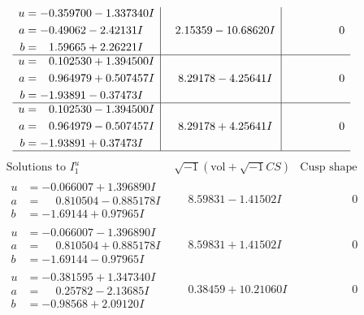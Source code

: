 \documentclass[1p]{elsarticle_modified}
\theoremstyle{definition}
\newcommand{\I}{\sqrt{-1}}
\begin{document}
$$\begin{array}{c|c|c}
\begin{aligned}
u &= -0.359700 - 1.337340 I \\
a &= -0.49062 - 2.42131 I \\
b &= \phantom{-}1.59665 + 2.26221 I\end{aligned}
 & \phantom{-}2.15359 - 10.68620 I & \phantom{-0.000000 } 0 \\ \hline\begin{aligned}
u &= \phantom{-}0.102530 + 1.394500 I \\
a &= \phantom{-}0.964979 + 0.507457 I \\
b &= -1.93891 - 0.37473 I\end{aligned}
 & \phantom{-}8.29178 - 4.25641 I & \phantom{-0.000000 } 0 \\ \hline\begin{aligned}
u &= \phantom{-}0.102530 - 1.394500 I \\
a &= \phantom{-}0.964979 - 0.507457 I \\
b &= -1.93891 + 0.37473 I\end{aligned}
 & \phantom{-}8.29178 + 4.25641 I & \phantom{-0.000000 } 0\\
 \hline 
 \end{array}$$\newpage$$\begin{array}{c|c|c}  
\text{Solutions to }I^u_{1}& \I (\text{vol} + \sqrt{-1}CS) & \text{Cusp shape}\\
 \hline 
\begin{aligned}
u &= -0.066007 + 1.396890 I \\
a &= \phantom{-}0.810504 - 0.885178 I \\
b &= -1.69144 + 0.97965 I\end{aligned}
 & \phantom{-}8.59831 - 1.41502 I & \phantom{-0.000000 } 0 \\ \hline\begin{aligned}
u &= -0.066007 - 1.396890 I \\
a &= \phantom{-}0.810504 + 0.885178 I \\
b &= -1.69144 - 0.97965 I\end{aligned}
 & \phantom{-}8.59831 + 1.41502 I & \phantom{-0.000000 } 0 \\ \hline\begin{aligned}
u &= -0.381595 + 1.347340 I \\
a &= \phantom{-}0.25782 - 2.13685 I \\
b &= -0.98568 + 2.09120 I\end{aligned}
 & \phantom{-}0.38459 + 10.21060 I & \phantom{-0.000000 } 0 \\ \hline\begin{aligned}

\end{aligned}
\end{array}$$
\end{document}
